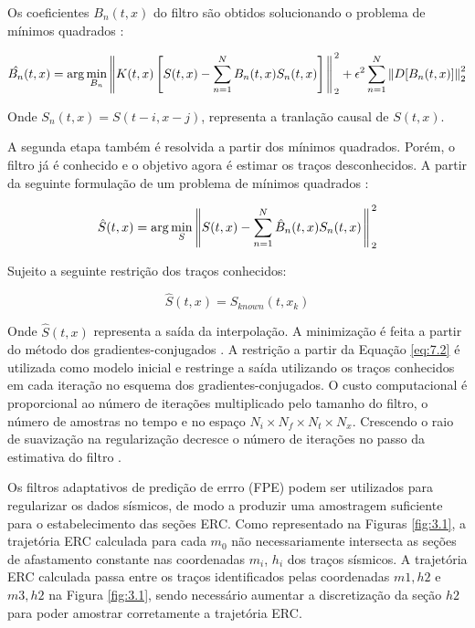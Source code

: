 Os coeficientes $B_n(t,x)$ do filtro são obtidos
solucionando o problema de mínimos quadrados \cite{liu11}:

\begin{equation}
\hat{B_n}(t,x) = \arg \min_{B_n} \left \rVert K(t,x) \left [ S(t,x) - \sum^N_{n=1}B_n(t,x)S_n(t,x) \right ] \right \Arrowvert^2_2 
+ \epsilon^2 \sum^N_{n=1} \left \rVert D [ B_n(t,x) ] \right \Arrowvert^2_2
\end{equation}

Onde $S_n(t,x) = S(t-i,x-j)$, representa a tranlação causal de $S(t,x)$. 

A segunda etapa também é resolvida a partir dos mínimos quadrados. Porém,
o filtro já é conhecido e o objetivo agora é estimar os traços desconhecidos.
A partir da seguinte formulação de um problema de mínimos quadrados \cite{liu11}:

\begin{equation}
\label{eq:7.1}
 \hat{S}(t,x) = \arg \min_S \left \rVert S(t,x) - \sum^N_{n=1}\hat{B}_n(t,x) S_n(t,x) \right \Arrowvert^2_2
\end{equation}

Sujeito a seguinte restrição dos traços conhecidos:

\begin{equation}
\label{eq:7.2}
 \hat{S}(t,x) = S_{known}(t,x_k)
\end{equation}

Onde $\hat{S}(t,x)$ representa a saída da interpolação.
A minimização é feita a partir do método dos gradientes-conjugados \cite{hestenes}. 
A restrição a partir da Equação \ref{eq:7.2} é utilizada como modelo inicial e restringe
a saída utilizando os traços conhecidos em cada iteração no esquema dos gradientes-conjugados.
O custo computacional é proporcional ao número de iterações multiplicado
pelo tamanho do filtro, o número de amostras no tempo e no espaço $N_i \times N_f \times N_t \times N_x$. 
Crescendo o raio de suavização na regularização decresce o número de iterações no passo da
estimativa do filtro \cite{liu11}.

Os filtros adaptativos de predição de errro (FPE) podem ser utilizados para regularizar os dados sísmicos,
de modo a produzir uma amostragem suficiente para o estabelecimento das seções ERC.
Como representado na Figuras \ref{fig:3.1}, a trajetória ERC calculada para cada $m_0$ não
necessariamente intersecta as seções de afastamento constante nas coordenadas $m_i$, $h_i$ dos traços sísmicos. 
A trajetória ERC calculada passa entre os traços identificados pelas coordenadas $m1,h2$ e $m3, h2$ na Figura \ref{fig:3.1},
sendo necessário aumentar a discretização da seção $h2$ para poder amostrar corretamente a trajetória ERC.

